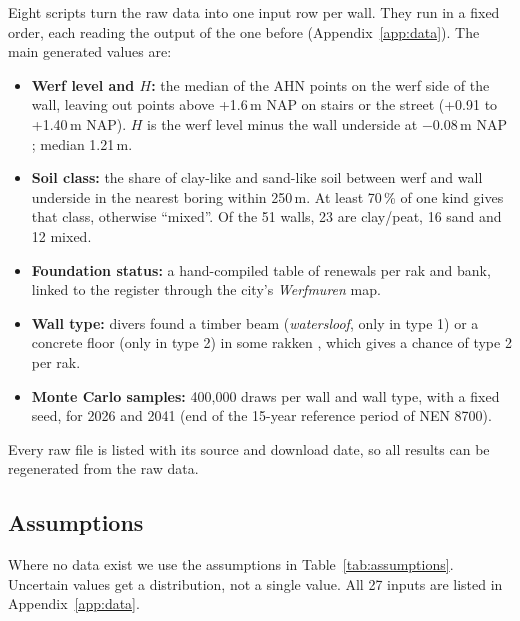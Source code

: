 Eight scripts turn the raw data into one input row per wall. They run in a
fixed order, each reading the output of the one before
(Appendix~\ref{app:data}). The main generated values are:
\begin{itemize}\setlength{\itemsep}{0pt}\setlength{\parskip}{0pt}
  \item \textbf{Werf level and $H$:} the median of the AHN points on the werf
    side of the wall, leaving out points above +1.6\,m NAP on stairs or the
    street (+0.91 to +1.40\,m NAP). $H$ is the werf level minus the wall
    underside at $-0.08$\,m NAP \cite{erfgoed158}; median 1.21\,m.
  \item \textbf{Soil class:} the share of clay-like and sand-like soil between
    werf and wall underside in the nearest boring within 250\,m. At least
    70\,\% of one kind gives that class, otherwise ``mixed''. Of the 51 walls,
    23 are clay/peat, 16 sand and 12 mixed.
  \item \textbf{Foundation status:} a hand-compiled table of renewals per rak
    and bank, linked to the register through the city's \emph{Werfmuren} map.
  \item \textbf{Wall type:} divers found a timber beam (\emph{watersloof}, only
    in type 1) or a concrete floor (only in type 2) in some rakken
    \cite{tno2009}, which gives a chance of type 2 per rak.
  \item \textbf{Monte Carlo samples:} 400{,}000 draws per wall and wall type,
    with a fixed seed, for 2026 and 2041 (end of the 15-year reference period
    of NEN 8700).
\end{itemize}
Every raw file is listed with its source and download date, so all results
can be regenerated from the raw data.

\subsection{Assumptions}\label{sec:data-assumptions}

Where no data exist we use the assumptions in Table~\ref{tab:assumptions}.
Uncertain values get a distribution, not a single value. All 27 inputs are
listed in Appendix~\ref{app:data}.

